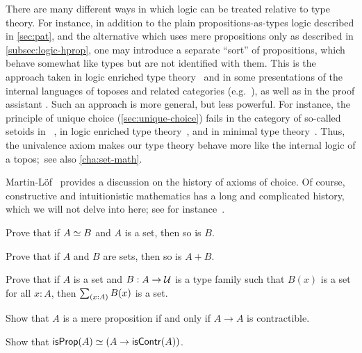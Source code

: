 There are many different ways in which logic can be treated relative to type theory.
For instance, in addition to the plain propositions-as-types logic described in \cref{sec:pat}, and the alternative which uses mere propositions only as described in \cref{subsec:logic-hprop}, one may introduce a separate ``sort'' of propositions, which behave somewhat like types but are not identified with them.
This is the approach taken in logic enriched type theory~\cite{aczel2002collection} and in some presentations of the internal languages of toposes and related categories (e.g.~\cite{jacobs1999categorical,elephant}), as well as in the proof assistant \Coq.
Such an approach is more general, but less powerful.
For instance, the principle of unique choice (\cref{sec:unique-choice}) fails in the category of so-called setoids in \Coq~\cite{Spiwack}, in logic enriched type theory~\cite{aczel2002collection}, and in minimal type theory~\cite{maietti2005toward}.
Thus, the univalence axiom makes our type theory behave more like the internal logic of a topos;~see also \cref{cha:set-math}.

Martin-L\"of~\cite{martin2006100} provides a discussion on the history of axioms of choice.
Of course, constructive and intuitionistic mathematics has a long and complicated history, which we will not delve into here; see for instance~\cite{TroelstraI,TroelstraII}.

\sectionExercises

\begin{ex}\label{ex:equiv-functor-set}
  Prove that if $A \simeq B$ and $A$ is a set, then so is $B$.
\end{ex}

\begin{ex}\label{ex:isset-coprod}
  Prove that if $A$ and $B$ are sets, then so is $A+B$.
\end{ex}

\begin{ex}\label{ex:isset-sigma}
  Prove that if $A$ is a set and $B:A\to \mathcal{U}$ is a type family such that $B(x)$ is a set for all $x:A$, then $\sm{x:A} B(x)$ is a set.
\end{ex}

\begin{ex}\label{ex:prop-endocontr}
  Show that $A$ is a mere proposition if and only if $A\to A$ is contractible.
\end{ex}

\begin{ex}\label{ex:prop-inhabcontr}
  Show that $\mathsf{isProp}(A) \simeq (A\to\mathsf{isContr}(A))$.
\end{ex}

